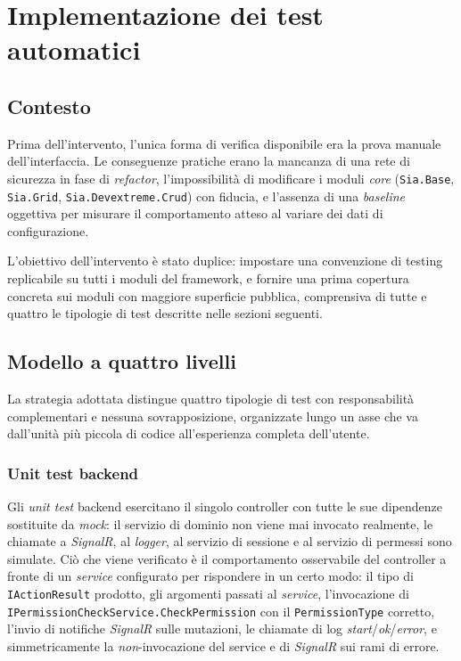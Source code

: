 \chapter{Implementazione dei test automatici}
\label{cap:test-implementazione}


\section{Contesto}

Prima dell'intervento, l'unica forma di verifica disponibile era la prova manuale
dell'interfaccia. Le conseguenze pratiche erano la mancanza di una rete di sicurezza
in fase di \emph{refactor}, l'impossibilità di modificare i moduli \emph{core}
(\texttt{Sia.Base}, \texttt{Sia.Grid}, \texttt{Sia.Devextreme.Crud}) con fiducia, e
l'assenza di una \emph{baseline} oggettiva per misurare il comportamento atteso al
variare dei dati di configurazione.

L'obiettivo dell'intervento è stato duplice: impostare una convenzione di testing
replicabile su tutti i moduli del framework, e fornire una prima copertura concreta
sui moduli con maggiore superficie pubblica, comprensiva di tutte e quattro le
tipologie di test descritte nelle sezioni seguenti.

\section{Modello a quattro livelli}

La strategia adottata distingue quattro tipologie di test con responsabilità
complementari e nessuna sovrapposizione, organizzate lungo un asse che va dall'unità
più piccola di codice all'esperienza completa dell'utente.

\subsection{Unit test backend}

Gli \emph{unit test} backend esercitano il singolo controller con tutte le sue
dipendenze sostituite da \emph{mock}: il servizio di dominio non viene mai invocato
realmente, le chiamate a \emph{SignalR}, al \emph{logger}, al servizio di sessione e
al servizio di permessi sono simulate. Ciò che viene verificato è il comportamento
osservabile del controller a fronte di un \emph{service} configurato per rispondere
in un certo modo: il tipo di \texttt{IActionResult} prodotto, gli argomenti passati
al \emph{service}, l'invocazione di \texttt{IPermissionCheckService.CheckPermission}
con il \texttt{PermissionType} corretto, l'invio di notifiche \emph{SignalR} sulle
mutazioni, le chiamate di log \emph{start}/\emph{ok}/\emph{error}, e simmetricamente
la \emph{non}-invocazione del service e di \emph{SignalR} sui rami di errore.

